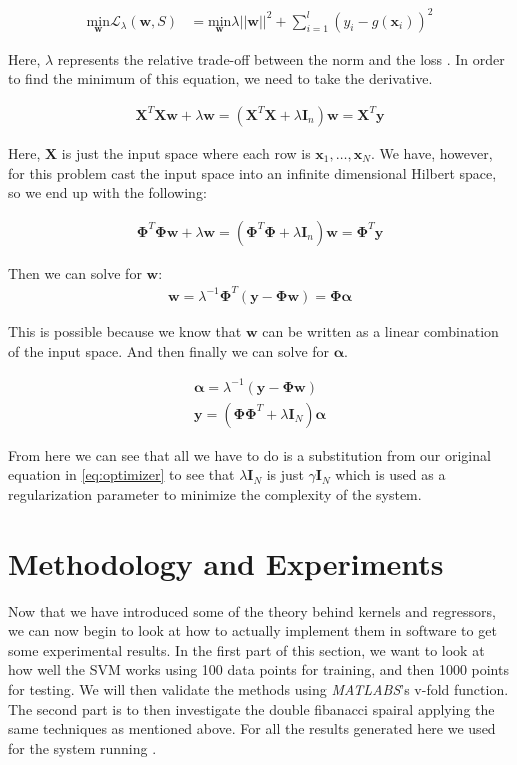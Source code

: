 \documentclass[11pt, twoside]{article}   	%
\begin{document}
\begin{align*}
\underset{\mathbf{w}}{\text{min}} \mathbf{\mathcal{L}}_\lambda (\mathbf{w}, S) &= 
\underset{\mathbf{w}}{\text{min}} \lambda ||\mathbf{w}||^2 + \sum_{i=1}^{l}(y_i - g(\mathbf{x}_i))^2
\end{align*}

Here, $\lambda$ represents the relative trade-off between the norm and the loss \cite{kernelmethods}. In order to find the minimum of this equation, 
we need to take the derivative. 

\begin{align*}
\mathbf{X}^T\mathbf{X}\mathbf{w} + \lambda\mathbf{w} = (\mathbf{X}^T\mathbf{X} + \lambda \mathbf{I}_n)\mathbf{w} = \mathbf{X}^T\mathbf{y}
\end{align*}

Here, $\mathbf{X}$ is just the input space where each row is $\mathbf{x}_1, \ldots, \mathbf{x}_N$. We have, however, for this problem
cast the input space into an infinite dimensional Hilbert space, so we end up with the following: 

\begin{align*}
\mathbf{\Phi}^T\mathbf{\Phi}\mathbf{w} + \lambda\mathbf{w} = (\mathbf{\Phi}^T\mathbf{\Phi} + \lambda \mathbf{I}_n)\mathbf{w} = \mathbf{\Phi}^T\mathbf{y}
\end{align*}

Then we can solve for $\mathbf{w}$: 
\begin{align*}
\mathbf{w} = \lambda^{-1} \mathbf{\Phi}^T (\mathbf{y} - \mathbf{\Phi} \mathbf{w}) = \mathbf{\Phi}\mathbf{\alpha}
\end{align*}

This is possible because we know that $\mathbf{w}$ can be written as a linear combination of the input space. And then finally we can solve
for $\mathbf{\alpha}$.

\begin{align*}
\bm{\alpha} = \lambda^{-1}(\mathbf{y} - \mathbf{\Phi} \mathbf{w}) \\
\mathbf{y} = (\mathbf{\Phi \Phi}^T + \lambda\mathbf{I}_N)\mathbf{\alpha}
\end{align*}

From here we can see that all we have to do is a substitution from our original equation in \ref{eq:optimizer} to see that
$\lambda\bm{I}_N$ is just $\gamma\bm{I}_N$ which is used as a regularization parameter to minimize the complexity 
of the system. 

\section{Methodology and Experiments}
Now that we have introduced some of the theory behind kernels and regressors, we can now begin to look at how to 
actually implement them in software to get some experimental results. 
In the first part of this section, we want to look at how well the SVM works using
100 data points for training, and then 1000 points for testing. We will
then validate the methods using \textit{MATLABS}'s v-fold function. The
second part is to then investigate the double fibanacci spairal applying
the same techniques as mentioned above. For all the results generated here
we used  for the system running
.
\end{document}
